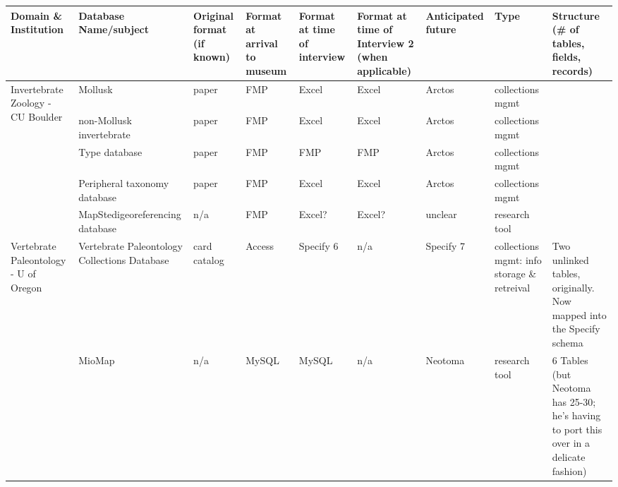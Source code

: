 \begin{tabular}{@{}lllllllll@{}}
\toprule
Domain \& Institution & Database Name/subject & Original format (if known) & Format at arrival to museum & Format at time of interview & Format at time of Interview 2 (when applicable) & Anticipated future & Type & Structure (\# of tables, fields, records) \\ \midrule
\multicolumn{1}{|l|}{\multirow{5}{*}{Invertebrate Zoology - CU Boulder}} & \multicolumn{1}{l|}{Mollusk} & \multicolumn{1}{l|}{paper} & \multicolumn{1}{l|}{FMP} & \multicolumn{1}{l|}{Excel} & \multicolumn{1}{l|}{Excel} & \multicolumn{1}{l|}{Arctos} & \multicolumn{1}{l|}{collections mgmt} &  \\ \cmidrule(lr){2-8}
\multicolumn{1}{|l|}{} & \multicolumn{1}{l|}{non-Mollusk invertebrate} & \multicolumn{1}{l|}{paper} & \multicolumn{1}{l|}{FMP} & \multicolumn{1}{l|}{Excel} & \multicolumn{1}{l|}{Excel} & \multicolumn{1}{l|}{Arctos} & \multicolumn{1}{l|}{collections mgmt} &  \\ \cmidrule(lr){2-8}
\multicolumn{1}{|l|}{} & \multicolumn{1}{l|}{Type database} & \multicolumn{1}{l|}{paper} & \multicolumn{1}{l|}{FMP} & \multicolumn{1}{l|}{FMP} & \multicolumn{1}{l|}{FMP} & \multicolumn{1}{l|}{Arctos} & \multicolumn{1}{l|}{collections mgmt} &  \\ \cmidrule(lr){2-8}
\multicolumn{1}{|l|}{} & \multicolumn{1}{l|}{Peripheral taxonomy database} & \multicolumn{1}{l|}{paper} & \multicolumn{1}{l|}{FMP} & \multicolumn{1}{l|}{Excel} & \multicolumn{1}{l|}{Excel} & \multicolumn{1}{l|}{Arctos} & \multicolumn{1}{l|}{collections mgmt} &  \\ \cmidrule(lr){2-8}
\multicolumn{1}{|l|}{} & \multicolumn{1}{l|}{MapStedigeoreferencing database} & \multicolumn{1}{l|}{n/a} & \multicolumn{1}{l|}{FMP} & \multicolumn{1}{l|}{Excel?} & \multicolumn{1}{l|}{Excel?} & \multicolumn{1}{l|}{unclear} & \multicolumn{1}{l|}{research tool} &  \\ \midrule
\multicolumn{1}{|l|}{\multirow{2}{*}{Vertebrate Paleontology - U of Oregon}} & \multicolumn{1}{l|}{Vertebrate Paleontology Collections Database} & \multicolumn{1}{l|}{card catalog} & \multicolumn{1}{l|}{Access} & \multicolumn{1}{l|}{Specify 6} & \multicolumn{1}{l|}{n/a} & \multicolumn{1}{l|}{Specify 7} & \multicolumn{1}{l|}{collections mgmt: info storage \& retreival} & \multicolumn{1}{l|}{Two unlinked tables, originally.  Now mapped into the Specify schema} \\ \cmidrule(l){2-9} 
\multicolumn{1}{|l|}{} & \multicolumn{1}{l|}{MioMap} & \multicolumn{1}{l|}{n/a} & \multicolumn{1}{l|}{MySQL} & \multicolumn{1}{l|}{MySQL} & \multicolumn{1}{l|}{n/a} & \multicolumn{1}{l|}{Neotoma} & \multicolumn{1}{l|}{research tool} & \multicolumn{1}{l|}{6 Tables (but Neotoma has 25-30; he's having to port this over in a delicate fashion)} \\ \midrule

\end{tabular}
